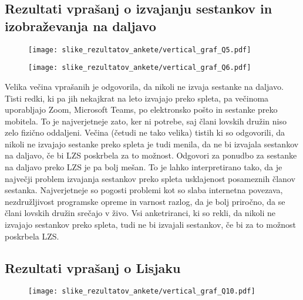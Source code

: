 \documentclass[a4paper,12pt,openright]{book}
\begin{document}
\subsection{Rezultati vprašanj o izvajanju sestankov in izobraževanja na daljavo}


\begin{figure}[H]
    \centering
    \texttt{[image: slike\_rezultatov\_ankete/vertical\_graf\_Q5.pdf]}
\end{figure}

\begin{figure}[H]
    \centering
    \texttt{[image: slike\_rezultatov\_ankete/vertical\_graf\_Q6.pdf]}
\end{figure}



Velika večina vprašanih je odgovorila, da nikoli ne izvaja sestanke na daljavo. 
Tisti redki, ki pa jih nekajkrat na leto izvajajo preko spleta, pa večinoma uporabljajo Zoom, Microsoft Teams, po elektronsko pošto in sestanke preko mobitela.
To je najverjetneje zato, ker ni potrebe, saj člani lovskih družin niso zelo fizično oddaljeni.
Večina (četudi ne tako velika) tistih ki so odgovorili, da nikoli ne izvajajo sestanke preko spleta je tudi menila, da ne bi izvajala sestankov na daljavo, če bi LZS poskrbela za to možnost.
Odgovori za ponudbo za sestanke na daljavo preko LZS je pa bolj mešan.
To je lahko interpretirano tako, da je največji problem izvajanja sestankov preko spleta usklajenost posameznih članov sestanka.
Najverjetneje so pogosti problemi kot so slaba internetna povezava, nezdružljivost programske opreme in varnost razlog, da je bolj priročno, da se člani lovskih družin srečajo v živo.
Vsi anketriranci, ki so rekli, da nikoli ne izvajajo sestankov preko spleta, tudi ne bi izvajali sestankov, če bi za to možnost poskrbela LZS.


\subsection{Rezultati vprašanj o Lisjaku}


\begin{figure}[H]
    \centering
    \texttt{[image: slike\_rezultatov\_ankete/vertical\_graf\_Q10.pdf]}
\end{figure}
\end{document}
